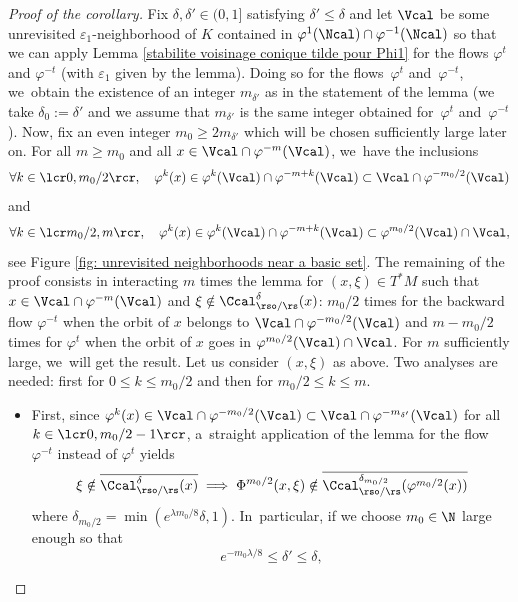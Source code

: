 \begin{proof}[Proof of the corollary]
Fix $\delta,\delta'\in(0,1]$ satisfying $\delta' \leq \delta$ and let $\Vcal$ be some unrevisited $\varepsilon_1$\nobreakdash-neighborhood of $K$ contained in $\varphi^1(\Ncal) \cap \varphi^{-1} (\Ncal)$ so that we can apply Lemma \ref{stabilite voisinage conique tilde pour Phi1} for the flows $\varphi^t$ and $\varphi^{-t}$ (with $\varepsilon_1$ given by the lemma). Doing so for the flows~$\varphi^t$ and~$\varphi^{-t}$, we~obtain the existence of an integer $m_{\delta'}$ as in the statement of the lemma (we take $\delta_0:= \delta'$ and we assume that $m_{\delta'}$ is the same integer obtained for~$\varphi^t$ and~$\varphi^{-t}$). Now, fix an even integer $m_0 \geq 2m_{\delta'}$ which will be chosen sufficiently large later on. For all $m \geq m_{0}$ and all $x \in \Vcal \cap \varphi^{-m} (\Vcal)$, we~have the inclusions
\[
\forall k \in \lcr 0, m_0 /2 \rcr, \quad \varphi^{k} (x) \in \varphi^k (\Vcal) \cap \varphi^{-m + k} (\Vcal) \subset \Vcal \cap \varphi^{- m_{0}/2} (\Vcal)
\]
and
\[
\forall k \in \lcr m_0/2, m \rcr, \quad \varphi^{k} (x) \in \varphi^k (\Vcal) \cap \varphi^{-m + k} (\Vcal) \subset \varphi^{m_{0}/2} (\Vcal) \cap \Vcal,
\]
see Figure \ref{fig: unrevisited neighborhoods near a basic set}. The remaining of the proof consists in interacting $m$ times the lemma for $(x,\xi) \in T^* M$ such that $x \in \Vcal \cap \varphi^{-m} (\Vcal)$ and $\xi \notin \Ccal_{\rso/\rs}^{\delta} (x)$: $m_0/2$ times for the backward flow $\varphi^{-t}$ when the orbit of $x$ belongs to $\Vcal \cap \varphi^{- m_0/2} (\Vcal)$ and $m - m_0/2$ times for $\varphi^t$ when the orbit of $x$ goes in $ \varphi^{m_{0}/2} (\Vcal) \cap \Vcal$. For $m$ sufficiently large, we~will get the result. Let us consider $(x,\xi)$ as above. Two analyses are needed: first for $0 \leq k \leq m_0/2$ and then for $m_0/2 \leq k \leq m$.
\begin{itemize}
\item First, since $\varphi^k (x) \in \Vcal \cap \varphi^{- m_{0}/2} (\Vcal) \subset \Vcal \cap \varphi^{- m_{\delta'}} (\Vcal)$ for all $k \in \lcr 0, m_0 /2-1 \rcr$, a~straight application of the lemma for the flow $\varphi^{-t}$ instead of $\varphi^t$ yields
\[
\xi \notin \overline{\Ccal_{\rso/\rs}^{\delta} (x)} \implies \Phi^{m_0/2} (x,\xi) \notin \overline{\Ccal_{\rso/\rs}^{\delta_{m_0/2}} (\varphi^{m_0/2}(x))}
\]
where $\delta_{m_0/2} = \min (e^{\lambda m_0 /8} \delta, 1)$. In~particular, if we choose $m_0 \in \N$ large enough so that
\[
e^{-m_0 \lambda /8} \leq \delta' \leq \delta,
\]
\end{itemize}
\end{proof}
